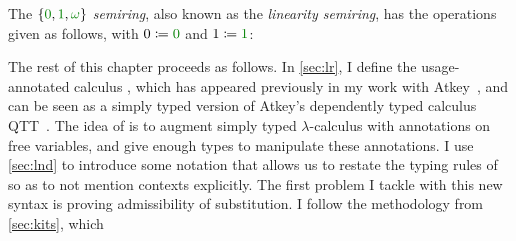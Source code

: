 \begin{example}\label{def:lin-semiring}
  The \emph{$\{\gr0, \gr1, \gr\omega\}$ semiring}, also known as the
  \emph{linearity semiring}, has the operations given as follows, with
  $0 \coloneqq \gr0$ and $1 \coloneqq \gr1$:

\end{example}


The rest of this chapter proceeds as follows.
In \cref{sec:lr}, I define the usage-annotated calculus \name{}, which has
appeared previously in my work with Atkey~\cite{WA21}, and can be seen as a
simply typed version of Atkey's dependently typed calculus QTT~\cite{Atkey18}.
The idea of \name{} is to augment simply typed $\lambda$-calculus with
annotations on free variables, and give enough types to manipulate these
annotations.
I use \cref{sec:lnd} to introduce some notation that allows us to restate the
typing rules of \name{} so as to not mention contexts explicitly.
The first problem I tackle with this new syntax is proving admissibility of
substitution.
I follow the methodology from \cref{sec:kits}, which

